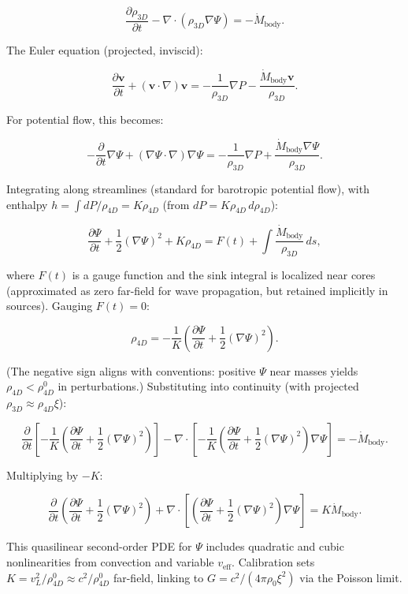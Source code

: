 \documentclass{article}
\begin{document}
\[
\frac{\partial \rho_{3D}}{\partial t} - \nabla \cdot (\rho_{3D} \nabla \Psi) = -\dot{M}_{\text{body}}.
\]

The Euler equation (projected, inviscid):

\[
\frac{\partial \mathbf{v}}{\partial t} + (\mathbf{v} \cdot \nabla) \mathbf{v} = -\frac{1}{\rho_{3D}} \nabla P - \frac{\dot{M}_{\text{body}} \mathbf{v}}{\rho_{3D}}.
\]

For potential flow, this becomes:

\[
-\frac{\partial}{\partial t} \nabla \Psi + (\nabla \Psi \cdot \nabla) \nabla \Psi = -\frac{1}{\rho_{3D}} \nabla P + \frac{\dot{M}_{\text{body}} \nabla \Psi}{\rho_{3D}}.
\]

Integrating along streamlines (standard for barotropic potential flow), with enthalpy $h = \int dP / \rho_{4D} = K \rho_{4D}$ (from $dP = K \rho_{4D} \, d\rho_{4D}$):

\[
\frac{\partial \Psi}{\partial t} + \frac{1}{2} (\nabla \Psi)^2 + K \rho_{4D} = F(t) + \int \frac{\dot{M}_{\text{body}}}{\rho_{3D}} \, ds,
\]

where $F(t)$ is a gauge function and the sink integral is localized near cores (approximated as zero far-field for wave propagation, but retained implicitly in sources). Gauging $F(t) = 0$:

\[
\rho_{4D} = -\frac{1}{K} \left( \frac{\partial \Psi}{\partial t} + \frac{1}{2} (\nabla \Psi)^2 \right).
\]

(The negative sign aligns with conventions: positive $\Psi$ near masses yields $\rho_{4D} < \rho_{4D}^0$ in perturbations.) Substituting into continuity (with projected $\rho_{3D} \approx \rho_{4D} \xi$):

\[
\frac{\partial}{\partial t} \left[ -\frac{1}{K} \left( \frac{\partial \Psi}{\partial t} + \frac{1}{2} (\nabla \Psi)^2 \right) \right] - \nabla \cdot \left[ -\frac{1}{K} \left( \frac{\partial \Psi}{\partial t} + \frac{1}{2} (\nabla \Psi)^2 \right) \nabla \Psi \right] = -\dot{M}_{\text{body}}.
\]

Multiplying by $-K$:

\[
\frac{\partial}{\partial t} \left( \frac{\partial \Psi}{\partial t} + \frac{1}{2} (\nabla \Psi)^2 \right) + \nabla \cdot \left[ \left( \frac{\partial \Psi}{\partial t} + \frac{1}{2} (\nabla \Psi)^2 \right) \nabla \Psi \right] = K \dot{M}_{\text{body}}.
\]

This quasilinear second-order PDE for $\Psi$ includes quadratic and cubic nonlinearities from convection and variable $v_{\text{eff}}$. Calibration sets $K = v_L^2 / \rho_{4D}^0 \approx c^2 / \rho_{4D}^0$ far-field, linking to $G = c^2 / (4\pi \rho_0 \xi^2)$ via the Poisson limit.
\end{document}
